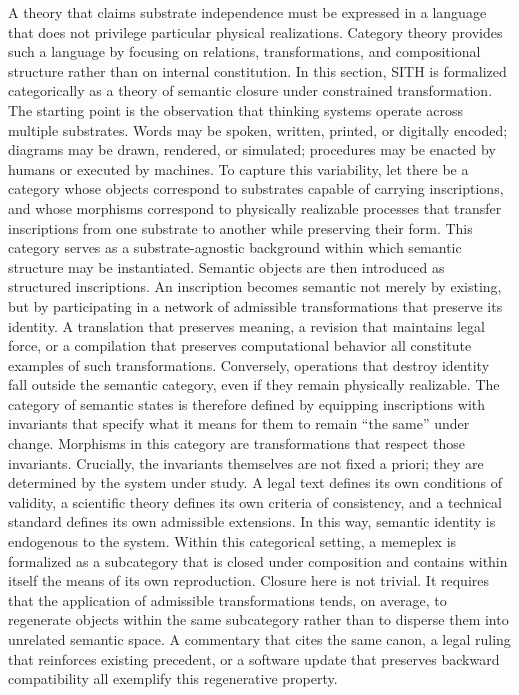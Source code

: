 \documentclass[11pt,oneside]{article}
\begin{document}
A theory that claims substrate independence must be expressed in a language that does not privilege particular physical realizations. Category theory provides such a language by focusing on relations, transformations, and compositional structure rather than on internal constitution. In this section, SITH is formalized categorically as a theory of semantic closure under constrained transformation.
The starting point is the observation that thinking systems operate across multiple substrates. Words may be spoken, written, printed, or digitally encoded; diagrams may be drawn, rendered, or simulated; procedures may be enacted by humans or executed by machines. To capture this variability, let there be a category whose objects correspond to substrates capable of carrying inscriptions, and whose morphisms correspond to physically realizable processes that transfer inscriptions from one substrate to another while preserving their form. This category serves as a substrate-agnostic background within which semantic structure may be instantiated.
Semantic objects are then introduced as structured inscriptions. An inscription becomes semantic not merely by existing, but by participating in a network of admissible transformations that preserve its identity. A translation that preserves meaning, a revision that maintains legal force, or a compilation that preserves computational behavior all constitute examples of such transformations. Conversely, operations that destroy identity fall outside the semantic category, even if they remain physically realizable.
The category of semantic states is therefore defined by equipping inscriptions with invariants that specify what it means for them to remain “the same” under change. Morphisms in this category are transformations that respect those invariants. Crucially, the invariants themselves are not fixed a priori; they are determined by the system under study. A legal text defines its own conditions of validity, a scientific theory defines its own criteria of consistency, and a technical standard defines its own admissible extensions. In this way, semantic identity is endogenous to the system.
Within this categorical setting, a memeplex is formalized as a subcategory that is closed under composition and contains within itself the means of its own reproduction. Closure here is not trivial. It requires that the application of admissible transformations tends, on average, to regenerate objects within the same subcategory rather than to disperse them into unrelated semantic space. A commentary that cites the same canon, a legal ruling that reinforces existing precedent, or a software update that preserves backward compatibility all exemplify this regenerative property.
\end{document}
